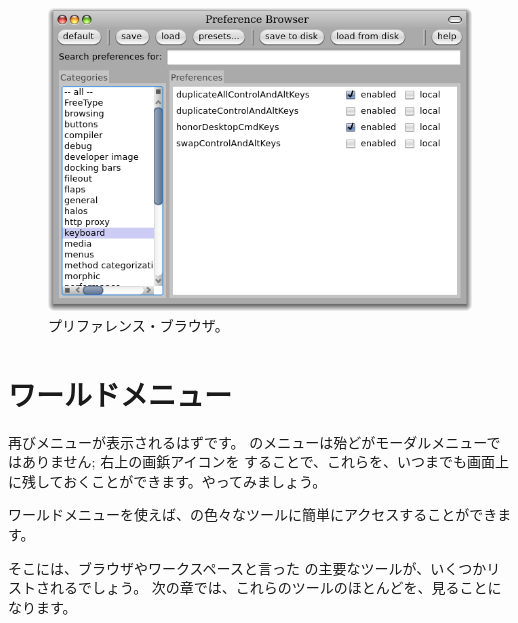 \documentclass[a4paper,10pt,twoside]{book}
\begin{document}
\begin{figure}[htb]
\centerline{\includegraphics[width=\textwidth]{PreferenceBrowser}}
\caption{プリファレンス・ブラウザ。}
\end{figure}


\section{ワールドメニュー}

再びメニューが表示されるはずです。
\pharo のメニューは殆どがモーダルメニューではありません; 右上の画鋲アイコンを \click することで、これらを、いつまでも画面上に残しておくことができます。やってみましょう。

ワールドメニューを使えば、\pharo の色々なツールに簡単にアクセスすることができます。


そこには、ブラウザやワークスペースと言った \pharo の主要なツールが、いくつかリストされるでしょう。
次の章では、これらのツールのほとんどを、見ることになります。

\end{document}

